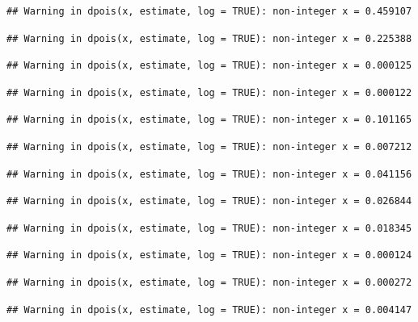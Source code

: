 \documentclass[]{article}
\begin{document}
\begin{verbatim}
## Warning in dpois(x, estimate, log = TRUE): non-integer x = 0.459107
\end{verbatim}

\begin{verbatim}
## Warning in dpois(x, estimate, log = TRUE): non-integer x = 0.225388
\end{verbatim}

\begin{verbatim}
## Warning in dpois(x, estimate, log = TRUE): non-integer x = 0.000125
\end{verbatim}

\begin{verbatim}
## Warning in dpois(x, estimate, log = TRUE): non-integer x = 0.000122
\end{verbatim}

\begin{verbatim}
## Warning in dpois(x, estimate, log = TRUE): non-integer x = 0.101165
\end{verbatim}

\begin{verbatim}
## Warning in dpois(x, estimate, log = TRUE): non-integer x = 0.007212
\end{verbatim}

\begin{verbatim}
## Warning in dpois(x, estimate, log = TRUE): non-integer x = 0.041156
\end{verbatim}

\begin{verbatim}
## Warning in dpois(x, estimate, log = TRUE): non-integer x = 0.026844
\end{verbatim}

\begin{verbatim}
## Warning in dpois(x, estimate, log = TRUE): non-integer x = 0.018345
\end{verbatim}

\begin{verbatim}
## Warning in dpois(x, estimate, log = TRUE): non-integer x = 0.000124
\end{verbatim}

\begin{verbatim}
## Warning in dpois(x, estimate, log = TRUE): non-integer x = 0.000272
\end{verbatim}

\begin{verbatim}
## Warning in dpois(x, estimate, log = TRUE): non-integer x = 0.004147
\end{verbatim}
\end{document}
